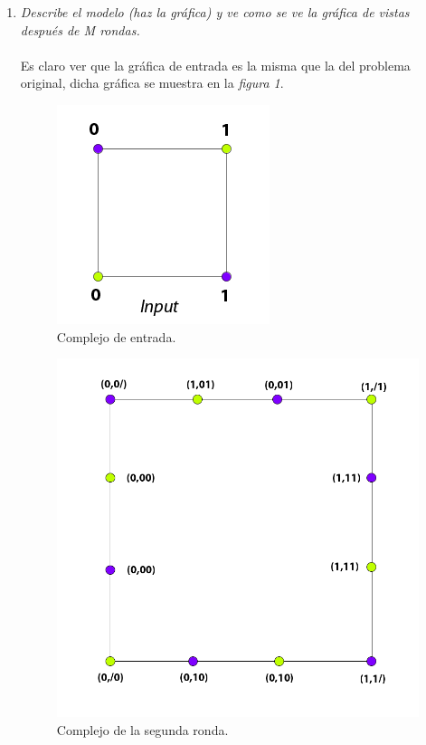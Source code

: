 \documentclass{article}
\begin{document}
\begin{enumerate}
{\begin{enumerate}
    \item{\textsl{Describe el modelo (haz la gráfica) y ve como se ve la gráfica de 
        vistas después de M rondas.}\\
      \\
      Es claro ver que la gráfica de entrada es la misma que la del problema original,
      dicha gráfica se muestra en la \textit{figura 1}.\\
      
      \begin{figure}
        \centering
        \includegraphics[scale=0.6]{3a_input.png}
        \caption{Complejo de entrada.}
      \end{figure}
      
      \begin{figure}
        \centering
        \includegraphics[scale=0.26]{3a_protocol.png}
        \caption{Complejo de la segunda ronda.}
      \end{figure}
          
}
\end{enumerate}}
\end{enumerate}
\end{document}
